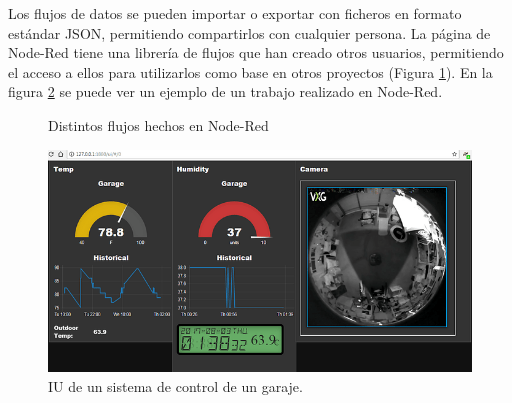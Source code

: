 Los flujos de datos se pueden importar o exportar con ficheros en formato estándar JSON, permitiendo compartirlos con cualquier persona. La página de Node-Red tiene una librería de flujos que han creado otros usuarios, permitiendo el acceso a ellos para utilizarlos como base en otros proyectos (Figura \ref{fig:flujos}). En la figura \ref{fig:ui-internet} se puede ver un ejemplo de un trabajo realizado en Node-Red.\\
\begin{figure}[h!]
  \begin{center}
    \hspace{2mm}
  \end{center}
\caption{Distintos flujos hechos en Node-Red} \label{fig:flujos}
\end{figure}
\begin{figure} [h!]
  \begin{center}
    \includegraphics[width=15cm]{figs/ui-internet}
  \end{center}
  \caption{IU de un sistema de control de un garaje.}
  \label{fig:ui-internet}
\end{figure}


